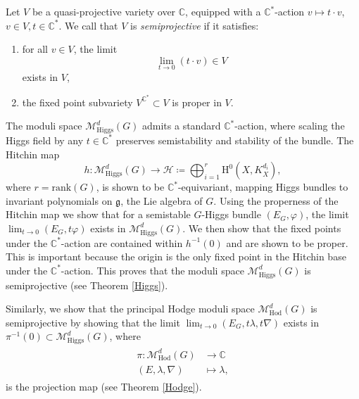 \documentclass[11pt, reqno]{amsart}
\numberwithin{equation}{section}
\theoremstyle{definition}
\begin{document}

	Let $V$ be a quasi-projective variety over $\mathbb{C}$, equipped with a $\mathbb{C}^*$-action $v \mapsto t\cdot v$, $v\in V, t \in \mathbb{C}^*$. We call that $V$ is \textit{semiprojective} if it satisfies:
	\begin{enumerate}
	    \item for all $v \in V$, the limit $$\lim_{t\to 0} (t\cdot v) \in V$$ exists in $V$,
	    \item the fixed point subvariety $V^{\mathbb{C}^*} \subset V$ is proper in $V$.
\end{enumerate}

The moduli space $\mathcal{M}^d_{\mathrm{Higgs}}(G)$ admits a standard $\mathbb{C}^*$-action, where scaling the Higgs field by any $t \in \mathbb{C}^*$ preserves semistability and stability of the bundle. The Hitchin map $$h : \mathcal{M}^d_{\mathrm{Higgs}}(G) \to \mathcal{H}\coloneqq \bigoplus_{i=1}^{r}\mathrm{H}^0(X, K_X^{d_i}),$$ where $r=\mathrm{rank}(G)$, is shown to be $\mathbb{C}^*$-equivariant, mapping Higgs bundles to invariant polynomials on $\mathfrak{g}$, the Lie algebra of $G$. Using the properness of the Hitchin map we show that for a semistable $G$-Higgs bundle $(E_G,\varphi)$, the limit $\lim_{t\to 0} (E_G,t\varphi)$ exists in $\mathcal{M}^d_{\mathrm{Higgs}}(G)$. We then show that the fixed points under the $\mathbb{C}^*$-action are contained within $h^{-1}(0)$ and are shown to be proper. This is important because the origin is the only fixed point in the Hitchin base under the $\mathbb{C}^*$-action. This proves that the moduli space $\mathcal{M}^d_{\mathrm{Higgs}}(G)$ is semiprojective (see Theorem \ref{Higgs}).

Similarly, we show that the principal Hodge moduli space $\mathcal{M}^{d}_{\mathrm{Hod}}(G)$ is semiprojective by showing that the limit $\lim_{t\to 0} (E_G,t\lambda,t\nabla)$ exists in $\pi^{-1}(0) \subset \mathcal{M}^d_\mathrm{Higgs}(G)$, where
\begin{align*}
\begin{split}
\pi: \mathcal{M}^{d}_\mathrm{Hod}(G) &\longrightarrow \mathbb{C}\\
(E,\lambda,\nabla) &\longmapsto \lambda,
\end{split}
\end{align*}
is the projection map (see Theorem \ref{Hodge}).
\end{document}
